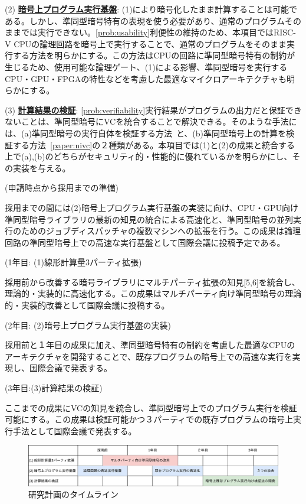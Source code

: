 \noindent(2) \underline{\textbf{暗号上プログラム実行基盤}}: (1)により暗号化したまま計算することは可能である。しかし、準同型暗号特有の表現を使う必要があり、通常のプログラムそのままでは実行できない。\ref{prob:usability}利便性の維持のため、本項目ではRISC-V CPUの論理回路を暗号上で実行することで、通常のプログラムをそのまま実行する方法を明らかにする。この方法はCPUの回路に準同型暗号特有の制約が生じるため、使用可能な論理ゲート、(1)による影響、準同型暗号を実行するCPU・GPU・FPGAの特性などを考慮した最適なマイクロアーキテクチャも明らかにする。

\noindent(3)  \underline{\textbf{計算結果の検証}}: \ref{prob:verifiability}実行結果がプログラムの出力だと保証できないことは、準同型暗号にVCを統合することで解決できる。そのような手法には、(a)準同型暗号の実行自体を検証する方法~\cite{paper:boostVC}と、(b)準同型暗号上の計算を検証する方法~\ref{paper:nivc}の２種類がある。本項目では(1)と(2)の成果と統合する上で(a),(b)のどちらがセキュリティ的・性能的に優れているかを明らかにし、その実装を与える。


\noindent(申請時点から採用までの準備)

採用までの間には(2)暗号上プログラム実行基盤の実装に向け、CPU・GPU向け準同型暗号ライブラリの最新の知見の統合による高速化と、準同型暗号の並列実行のためのジョブディスパッチャの複数マシンへの拡張を行う。この成果は論理回路の準同型暗号上での高速な実行基盤として国際会議に投稿予定である。

\noindent(1年目: (1)線形計算量3パーティ拡張)

採用前から改善する暗号ライブラリにマルチパーティ拡張の知見[5,6]を統合し、理論的・実装的に高速化する。この成果はマルチパーティ向け準同型暗号の理論的・実装的改善として国際会議に投稿する。

\noindent(2年目: (2)暗号上プログラム実行基盤の実装)

採用前と１年目の成果に加え、準同型暗号特有の制約を考慮した最適なCPUのアーキテクチャを開発することで、既存プログラムの暗号上での高速な実行を実現し、国際会議で発表する。

\noindent(3年目:(3)計算結果の検証)

ここまでの成果にVCの知見を統合し、準同型暗号上でのプログラム実行を検証可能にする。この成果は検証可能かつ３パーティでの既存プログラムの暗号上実行手法として国際会議で発表する。

\begin{figure}[h]
    \centering
    \includegraphics[width=\linewidth]{figures/schedule.drawio.png}
    \vspace*{-1cm}
    \caption{研究計画のタイムライン}
    \label{fig:schedule}
\end{figure}

